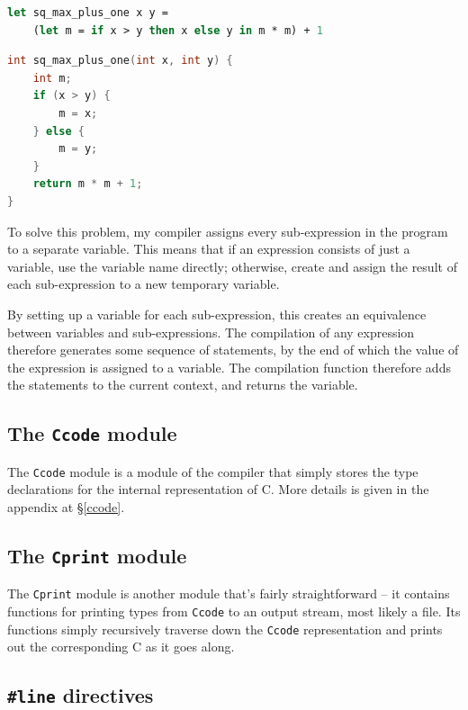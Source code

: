 \begin{lstlisting}[language=Caml]
let sq_max_plus_one x y =
    (let m = if x > y then x else y in m * m) + 1
\end{lstlisting}

\begin{lstlisting}[language=C]
int sq_max_plus_one(int x, int y) {
    int m;
    if (x > y) {
        m = x;
    } else {
        m = y;
    }
    return m * m + 1;
}
\end{lstlisting}

To solve this problem, my compiler assigns every sub-expression in the program
to a separate variable. This means that if an expression consists of just a
variable, use the variable name directly; otherwise, create and assign the
result of each sub-expression to a new temporary variable.

By setting up a variable for each sub-expression, this creates an equivalence
between variables and sub-expressions. The compilation of any expression
therefore generates some sequence of statements, by the end of which the value
of the expression is assigned to a variable. The compilation function therefore
adds the statements to the current context, and returns the variable. 

\subsection{The \texttt{Ccode} module}

The \texttt{Ccode} module is a module of the compiler that simply stores the
type declarations for the internal representation of C. More details is given in
the appendix at \S\ref{ccode}.

\subsection{The \texttt{Cprint} module}

The \texttt{Cprint} module is another module that's fairly straightforward --
it contains functions for printing types from \texttt{Ccode} to an output
stream, most likely a file. Its functions simply recursively traverse down the
\texttt{Ccode} representation and prints out the corresponding C as it goes
along.

\subsection{\texttt{\#}\texttt{line} directives} \label{line-directive}

